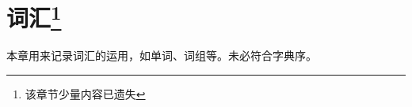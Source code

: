 \chapter[词汇]{词汇\protect\footnote{该章节少量内容已遗失}}
本章用来记录词汇的运用，如单词、词组等。未必符合字典序。

























